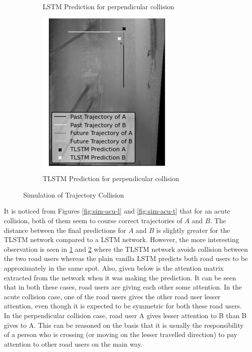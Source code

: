 \documentclass{article}
\begin{document}
\begin{figure}[H]
\begin{subfigure}{0.40\textwidth}
  \caption{LSTM Prediction for perpendicular collision}
  \label{fig:sim-perp-l}
\end{subfigure}
\begin{subfigure}{0.40\textwidth}
  \centering
  \includegraphics[width=\linewidth]{quali_results/sim-perp-t.png}
  \caption{TLSTM Prediction for perpendicular collision}
  \label{fig:sim-perp-t}
\end{subfigure}
\caption{Simulation of Trajectory Collision}
\label{fig:sims}
\end{figure}

It is noticed from Figures \ref{fig:sim-acu-l} and \ref{fig:sim-acu-t} that for an acute collision, both of them seem to course correct trajectories of $A$ and $B$. The distance between the final predictions for $A$ and $B$ is slightly greater for the TLSTM network compared to a LSTM network. However, the more interesting observation is seen in \ref{fig:sim-perp-l} and \ref{fig:sim-perp-t} where the TLSTM network avoids collision between the two road users whereas the plain vanilla LSTM predicts both road users to be approximately in the same spot. Also, given below is the attention matrix extracted from the network when it was making the prediction. It can be seen that in both these cases, road users are giving each other some attention. In the acute collision case, one of the road users gives the other road user lesser attention, even though it is expected to be symmetric for both these road users.  In the perpendicular collision case, road user A gives lesser attention to B than B gives to A. This can be reasoned on the basis that it is usually the responsibility of a person who is crossing (or moving on the lesser travelled direction) to pay attention to other road users on the main way.
\end{document}
